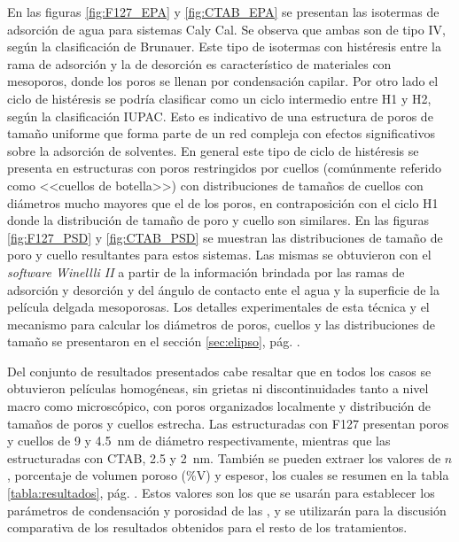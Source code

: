 		 En las figuras \ref{fig:F127_EPA} y \ref{fig:CTAB_EPA} se presentan las isotermas de adsorción de agua para sistemas Cal\pdmF\space y Cal\pdmC. Se observa que ambas son de tipo IV, según la clasificación de Brunauer\cite{Gregg1967,Violi2015,Fuertes2010}. Este tipo de isotermas con histéresis entre la rama de adsorción y la de desorción es característico de materiales con mesoporos, donde los poros se llenan por condensación capilar. Por otro lado el ciclo de histéresis se podría clasificar como un ciclo intermedio entre H1 y H2, según la clasificación IUPAC\cite{Thommes2015}. Esto es indicativo de una estructura de poros de tamaño uniforme que forma parte de un red compleja con efectos significativos sobre la adsorción de solventes.\cite{Thommes2015,Gregg1967,Lowell2004,Sing1985} En general este tipo de ciclo de histéresis se presenta en estructuras con poros restringidos por cuellos (comúnmente referido como <<cuellos de botella>>) con distribuciones de tamaños de cuellos con diámetros mucho mayores que el de los poros, en contraposición con el ciclo H1 donde la distribución de tamaño de poro y cuello son similares.\cite{Thommes2015,Naumov2009} En las figuras \ref{fig:F127_PSD} y \ref{fig:CTAB_PSD} se muestran las distribuciones de tamaño de poro y cuello resultantes para estos sistemas. Las mismas se obtuvieron con el \textit{software Winellli II} a partir de la información brindada por las ramas de  adsorción y desorción y del ángulo de contacto ente el agua y la superficie de la película delgada mesoporosas. Los detalles experimentales de esta técnica y el mecanismo para calcular los diámetros de poros, cuellos y las distribuciones de tamaño se presentaron en el sección \ref{sec:elipso}, pág. \pageref{sec:elipso}.

		 Del conjunto de resultados presentados cabe resaltar que en todos los casos se obtuvieron películas homogéneas, sin grietas ni discontinuidades tanto a nivel macro como microscópico, con poros organizados localmente y distribución de tamaños de poros y cuellos estrecha. Las \pdm\space estructuradas con F127 presentan poros y cuellos de 9 y \SI{4.5}{\nm} de diámetro respectivamente, mientras que las estructuradas con CTAB, 2.5 y \SI{2}{\nm}. También se pueden extraer los valores de $n$, porcentaje de volumen poroso (\%V) y espesor, los cuales se resumen en la tabla \ref{tabla:resultados}, pág. \pageref{tabla:resultados}. Estos valores son los que se usarán para establecer los parámetros de condensación y porosidad de las \pdm, y se utilizarán para la discusión comparativa de los resultados obtenidos para el resto de los tratamientos.

